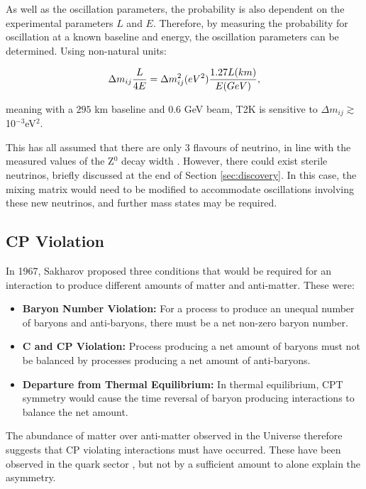 As well as the oscillation parameters, the probability is also dependent on the experimental parameters $L$ and $E$. Therefore, by measuring the probability for oscillation at a known baseline and energy, the oscillation parameters can be determined. Using non-natural units:

\begin{equation}
\Delta m_{ij} \frac{L}{4E} = \Delta m_{ij}^2 (eV^2) \frac{1.27 L (km)}{E (GeV)},
\vspace{10pt}
\end{equation}

meaning with a $295$ km baseline and $0.6$ GeV beam, T2K is sensitive to $\Delta m_{ij} \gtrsim$ 10$^{-3}$eV$^2$.

This has all assumed that there are only 3 flavours of neutrino, in line with the measured values of the Z$^0$ decay width \cite{lepslac,universalN}. However, there could exist sterile neutrinos, briefly discussed at the end of Section \ref{sec:discovery}. In this case, the mixing matrix would need to be modified to accommodate oscillations involving these new neutrinos, and further mass states may be required. 

\subsection{CP Violation}
\label{cpv}

In 1967, Sakharov proposed three conditions that would be required for an interaction to produce different amounts of matter and anti-matter\cite{sakharov}. These were:

\begin{itemize} 

\item \textbf{Baryon Number Violation:} For a process to produce an unequal number of baryons and anti-baryons, there must be a net non-zero baryon number.

\item \textbf{C and CP Violation:} Process producing a net amount of baryons must not be balanced by processes producing a net amount of anti-baryons.

\item \textbf{Departure from Thermal Equilibrium:} In thermal equilibrium, CPT symmetry would cause the time reversal of baryon producing interactions to balance the net amount.

\end{itemize}

The abundance of matter over anti-matter observed in the Universe therefore suggests that CP violating interactions must have occurred. These have been observed in the quark sector \cite{quarkcpv}, but not by a sufficient amount to alone explain the asymmetry. 

